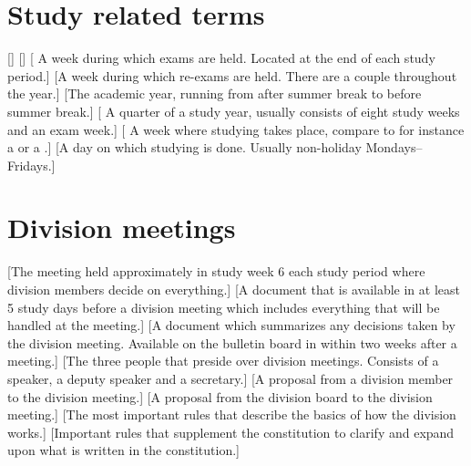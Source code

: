 \documentclass[a4paper]{article}
\begin{document}
\section{Study related terms}
\begin{description}
    []
    []
    [ A week during which exams are held. Located at the end of each study period.]
    [A week during which re-exams are held. There are a couple throughout the year.]
    [The academic year, running from after summer break to before summer break.]
    [ A quarter of a study year, usually consists of eight study weeks and an exam week.]
    [ A week where studying takes place, compare to for instance a \textit{} or a \textit{}.]
    [A day on which studying is done. Usually non-holiday Mondays--Fridays.]
\end{description}

\section{Division meetings}
\begin{description}
    [The meeting held approximately in study week 6 each study period where division members decide on everything.]
    [A document that is available in  at least 5 study days before a division meeting which includes everything that will be handled at the meeting.]
    [A document which summarizes any decisions taken by the division meeting. Available on the bulletin board in  within two weeks after a meeting.]
    [The three people that preside over division meetings. Consists of a speaker, a deputy speaker and a secretary.]
    [A proposal from a division member to the division meeting.]
    [A proposal from the division board to the division meeting.]
    [The most important rules that describe the basics of how the division works.]
    [Important rules that supplement the constitution to clarify and expand upon what is written in the constitution.]
\end{description}
\end{document}
